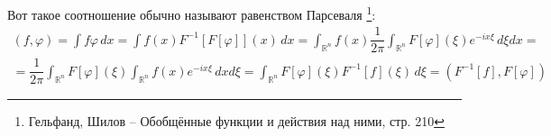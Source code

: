 Вот такое соотношение обычно называют равенством Парсеваля \footnote{Гельфанд, Шилов -- Обобщённые функции и действия над ними, стр. 210}:
\begin{multline*}
  (f, \varphi) = \int f \varphi \, dx = \int f(x) F^{-1} [ F[\varphi] ] (x) \, dx
  = \int_{\mathbb{R}^n} f(x) \dfrac{1}{2\pi}\int_{\mathbb{R}^n} F[\varphi] (\xi) e^{-ix \xi} \, d\xi dx = \\
  = \dfrac{1}{2\pi}\int_{\mathbb{R}^n} F[\varphi](\xi) \int_{\mathbb{R}^n} f(x) e^{-ix \xi} \, dx d\xi
  = \int_{\mathbb{R}^n} F[\varphi](\xi) F^{-1} [f] (\xi) \, d\xi
  = (F^{-1} [f], F[\varphi])
\end{multline*}
